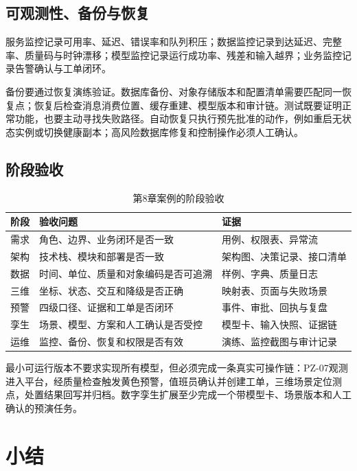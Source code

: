 \subsection{可观测性、备份与恢复}

服务监控记录可用率、延迟、错误率和队列积压；数据监控记录到达延迟、完整率、质量码与时钟漂移；模型监控记录运行成功率、残差和输入越界；业务监控记录告警确认与工单闭环。

备份要通过恢复演练验证。数据库备份、对象存储版本和配置清单需要匹配同一恢复点；恢复后检查消息消费位置、缓存重建、模型版本和审计链。测试既要证明正常功能，也要主动寻找失败路径\cite{myers2011}。自动恢复只执行预先批准的动作，例如重启无状态实例或切换健康副本；高风险数据库修复和控制操作必须人工确认。

\subsection{阶段验收}

\begin{table}[htbp]
\centering
\caption{第8章案例的阶段验收}
\label{tab:chapter8-acceptance}
\begin{tabular}{p{2.0cm}p{5.0cm}p{5.4cm}}
\toprule
阶段 & 验收问题 & 证据 \\
\midrule
需求 & 角色、边界、业务闭环是否一致 & 用例、权限表、异常流 \\
架构 & 技术栈、模块和部署是否一致 & 架构图、决策记录、接口清单 \\
数据 & 时间、单位、质量和对象编码是否可追溯 & 样例、字典、质量日志 \\
三维 & 坐标、状态、交互和降级是否正确 & 映射表、页面与失败场景 \\
预警 & 四级口径、证据和工单是否闭环 & 事件、审批、回执与复盘 \\
孪生 & 场景、模型、方案和人工确认是否受控 & 模型卡、输入快照、证据链 \\
运维 & 监控、备份、恢复和权限是否有效 & 演练、监控截图与审计记录 \\
\bottomrule
\end{tabular}
\end{table}

最小可运行版本不要求实现所有模型，但必须完成一条真实可操作链：PZ-07观测进入平台，经质量检查触发黄色预警，值班员确认并创建工单，三维场景定位测点，处置结果回写并归档。数字孪生扩展至少完成一个带模型卡、场景版本和人工确认的预演任务。

\section*{小结}

